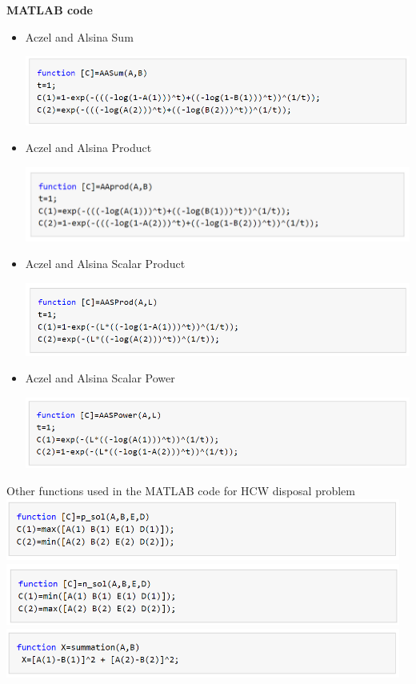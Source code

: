 \begin{flushleft}
    
\pagebreak
\textbf{MATLAB code}
\begin{itemize}
    

\item Aczel and Alsina Sum

\includegraphics[width = 13cm]{config/pictures/AAsum.png}
\item Aczel and Alsina Product

\includegraphics[width = 13cm]{config/pictures/AAProd.png}
\item Aczel and Alsina Scalar Product

\includegraphics[width = 13cm]{config/pictures/AASprod.png}
\item Aczel and Alsina Scalar Power

\includegraphics[width = 13cm]{config/pictures/AASpower.png}
\end{itemize}
 \item Other functions used in the MATLAB code for HCW disposal problem
\includegraphics[width = 13cm]{config/pictures/psol.png}
\includegraphics[width = 13cm]{config/pictures/nsol.png}
\includegraphics[width = 13cm]{config/pictures/summation.png}


\end{flushleft}
